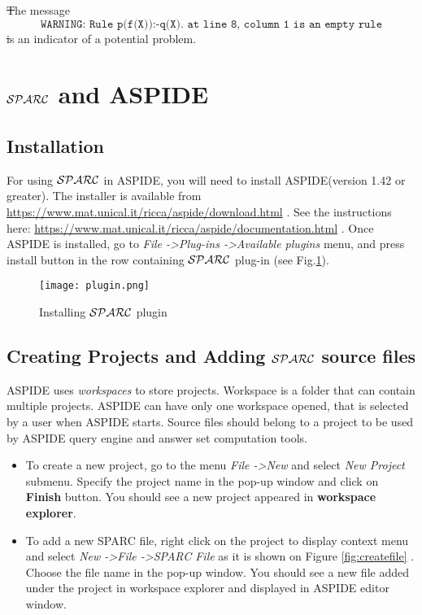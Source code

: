 \documentclass[12pt, letterpaper]{article}
\begin{document}
\st The message 
\begin{equation*}
\texttt{WARNING: Rule p(f(X)):-q(X). at line 8, column 1 is an empty rule} 
\end{equation*}
\st is an indicator of a potential problem.
\pagebreak
\section{${\cal SPARC}$ and ASPIDE}
\subsection{Installation}

For using ${\cal SPARC}$ in ASPIDE, you will need to install ASPIDE(version 1.42 or greater). 
The installer is available from {\scriptsize
\url{https://www.mat.unical.it/ricca/aspide/download.html}
}. See the instructions here:  {\scriptsize
\url{https://www.mat.unical.it/ricca/aspide/documentation.html}
}.  Once ASPIDE is installed, go to \textit{File -\textgreater Plug-ins -\textgreater Available plugins} menu, 
and press install button in the row containing ${\cal SPARC}$ plug-in (see Fig.\ref{fig:plug_install}).
\begin{figure}[ht]
\centering
\texttt{[image: plugin.png]}
\caption{Installing ${\cal SPARC}$ plugin}
\label{fig:plug_install}
\end{figure}


\pagebreak
\subsection{Creating Projects and Adding  ${\cal SPARC}$  source files}
ASPIDE uses \textit{workspaces} to store projects. Workspace is a folder that can contain multiple projects. ASPIDE can have only one workspace opened, that is selected by a user when ASPIDE starts. Source files should belong to a project to be used by  ASPIDE query engine and answer set computation tools. 

\begin{itemize}
\item To create a new project, go to the menu \textit{File -\textgreater New} and select \textit{New Project} submenu. Specify the project name in the pop-up window and click on \textbf{Finish} button. You should see a new project appeared in \textbf{workspace explorer}. 
\item To add a new SPARC file, right click on the project to display context menu and select \textit{New -\textgreater File -\textgreater SPARC File} as it is shown on Figure \ref{fig:createfile} . Choose the file name in the pop-up window. You should see a new file added under the project in workspace explorer and displayed in ASPIDE editor window.
\end{itemize}
\end{document}
